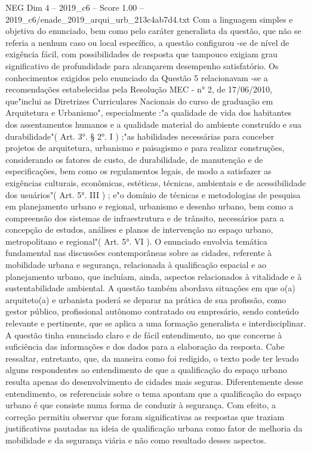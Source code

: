 \begin{textsample}{NEG Dim 4 – 2019\_c6 – Score 1.00 – 2019\_c6/enade\_2019\_arqui\_urb\_213c4ab7d4.txt}
Com a linguagem simples e objetiva do enunciado, bem como pelo caráter generalista da questão, que não se referia a nenhum caso ou local específico, a questão configurou -se de nível de exigência fácil, com possibilidades de resposta que tampouco exigiam grau significativo de profundidade para alcançarem desempenho satisfatório.
Os conhecimentos exigidos pelo enunciado da Questão 5 relacionavam -se a recomendações estabelecidas pela Resolução MEC - n{\EmojiFont °} 2, de 17/06/2010, que"inclui as Diretrizes Curriculares Nacionais do curso de graduação em Arquitetura e Urbanismo", especialmente :"a qualidade de vida dos habitantes dos assentamentos humanos e a qualidade material do ambiente construído e sua durabilidade"( Art. 3{\EmojiFont °}. § 2{\EmojiFont °}.
I ) ;"as habilidades necessárias para conceber projetos de arquitetura, urbanismo e paisagismo e para realizar construções, considerando os fatores de custo, de durabilidade, de manutenção e de especificações, bem como os regulamentos legais, de modo a satisfazer as exigências culturais, econômicas, estéticas, técnicas, ambientais e de acessibilidade dos usuários"( Art. 5{\EmojiFont °}.
III ) ; e"o domínio de técnicas e metodologias de pesquisa em planejamento urbano e regional, urbanismo e desenho urbano, bem como a compreensão dos sistemas de infraestrutura e de trânsito, necessários para a concepção de estudos, análises e planos de intervenção no espaço urbano, metropolitano e regional"( Art. 5{\EmojiFont °}.
VI ).
O enunciado envolvia temática fundamental nas discussões contemporâneas sobre as cidades, referente à mobilidade urbana e segurança, relacionada à qualificação espacial e ao planejamento urbano, que incluíam, ainda, aspectos relacionados à vitalidade e à sustentabilidade ambiental.
A questão também abordava situações em que o(a) arquiteto(a) e urbanista poderá se deparar na prática de sua profissão, como gestor público, profissional autônomo contratado ou empresário, sendo conteúdo relevante e pertinente, que se aplica a uma formação generalista e interdisciplinar.
A questão tinha enunciado claro e de fácil entendimento, no que concerne à suficiência das informações e dos dados para a elaboração da resposta.
Cabe ressaltar, entretanto, que, da maneira como foi redigido, o texto pode ter levado alguns respondentes ao entendimento de que a qualificação do espaço urbano resulta apenas do desenvolvimento de cidades mais seguras.
Diferentemente desse entendimento, os referenciais sobre o tema apontam que a qualificação do espaço urbano é que consiste numa forma de conduzir à segurança.
Com efeito, a correção permitiu observar que foram significativas as respostas que traziam justificativas pautadas na ideia de qualificação urbana como fator de melhoria da mobilidade e da segurança viária e não como resultado desses aspectos.

\end{textsample}
